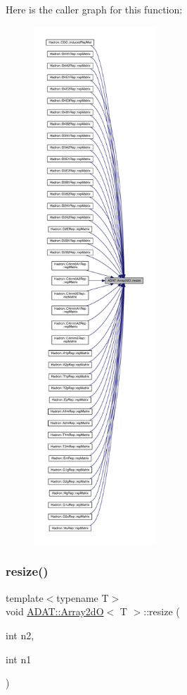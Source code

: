 Here is the caller graph for this function\+:\nopagebreak
\begin{figure}[H]
\begin{center}
\leavevmode
\includegraphics[height=550pt]{da/d08/classADAT_1_1Array2dO_abccbac468c29e2d8a24b9cd317e92247_icgraph}
\end{center}
\end{figure}
\mbox{\label{classADAT_1_1Array2dO_abccbac468c29e2d8a24b9cd317e92247}} 
\subsubsection{\texorpdfstring{resize()}{resize()}\hspace{0.1cm}{\footnotesize\ttfamily [2/4]}}
{\footnotesize\ttfamily template$<$typename T$>$ \\
void \mbox{\hyperlink{classADAT_1_1Array2dO}{A\+D\+A\+T\+::\+Array2dO}}$<$ T $>$\+::resize (\begin{DoxyParamCaption}\item[{int}]{n2,  }\item[{int}]{n1 }\end{DoxyParamCaption})\hspace{0.3cm}{\ttfamily [inline]}}

